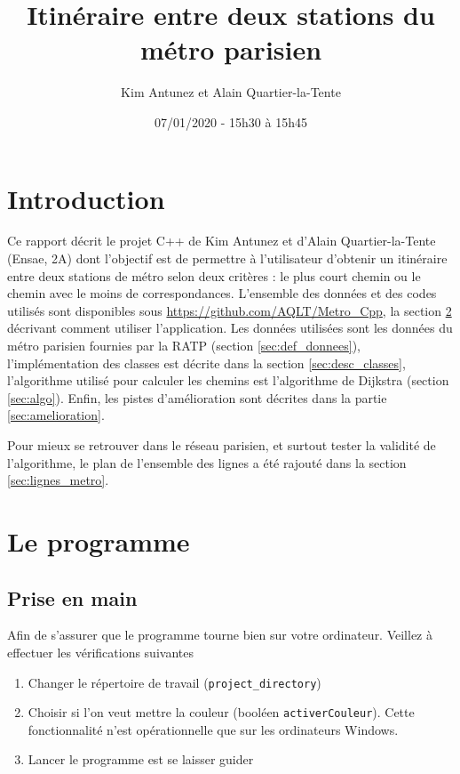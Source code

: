 \documentclass[,french]{article}
\title{Itinéraire entre deux stations du métro parisien}
\author{Kim Antunez et Alain Quartier-la-Tente}
\date{07/01/2020 - 15h30 à 15h45}
\begin{document}
\maketitle

{
\hypersetup{linkcolor=}
\setcounter{tocdepth}{2}
\tableofcontents
}
\hypertarget{introduction}{%
\section{Introduction}\label{introduction}}

Ce rapport décrit le projet C++ de Kim Antunez et d'Alain
Quartier-la-Tente (Ensae, 2A) dont l'objectif est de permettre à
l'utilisateur d'obtenir un itinéraire entre deux stations de métro selon
deux critères : le plus court chemin ou le chemin avec le moins de
correspondances. L'ensemble des données et des codes utilisés sont
disponibles sous \url{https://github.com/AQLT/Metro_Cpp}, la section
\ref{sec:le_programme} décrivant comment utiliser l'application. Les
données utilisées sont les données du métro parisien fournies par la
RATP (section \ref{sec:def_donnees}), l'implémentation des classes est
décrite dans la section \ref{sec:desc_classes}, l'algorithme utilisé
pour calculer les chemins est l'algorithme de Dijkstra (section
\ref{sec:algo}). Enfin, les pistes d'amélioration sont décrites dans la
partie \ref{sec:amelioration}.

Pour mieux se retrouver dans le réseau parisien, et surtout tester la
validité de l'algorithme, le plan de l'ensemble des lignes a été rajouté
dans la section \ref{sec:lignes_metro}.

\hypertarget{sec:le_programme}{%
\section{Le programme}\label{sec:le_programme}}

\hypertarget{prise-en-main}{%
\subsection{Prise en main}\label{prise-en-main}}

Afin de s'assurer que le programme tourne bien sur votre ordinateur.
Veillez à effectuer les vérifications suivantes

\begin{enumerate}
\def\labelenumi{\arabic{enumi}.}
\item
  Changer le répertoire de travail (\texttt{project\_directory})
\item
  Choisir si l'on veut mettre la couleur (booléen
  \texttt{activerCouleur}). Cette fonctionnalité n'est opérationnelle
  que sur les ordinateurs Windows.
\item
  Lancer le programme est se laisser guider
\end{enumerate}
\end{document}
